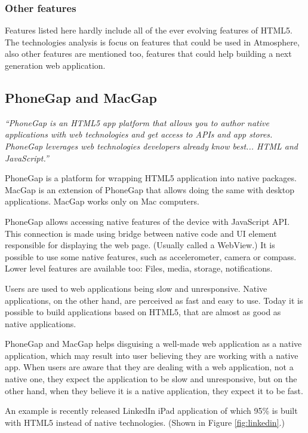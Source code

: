 \subsubsection{Other features}

Features listed here hardly include all of the ever evolving features of HTML5. The technologies analysis is focus on features that could be used in Atmosphere, also other features are mentioned too, features that could help building a next generation web application.

\subsection{PhoneGap and MacGap}

\emph{``PhoneGap is an HTML5 app platform that allows you to author native applications with web technologies and get access to APIs and app stores. PhoneGap leverages web technologies developers already know best... HTML and JavaScript.''} \citep{phonegap}

PhoneGap is a platform for wrapping HTML5 application into native packages. MacGap is an extension of PhoneGap that allows doing the same with desktop applications. MacGap works only on Mac computers.

PhoneGap allows accessing native features of the device with JavaScript API. This connection is made using bridge between native code and UI element responsible for displaying the web page. (Usually called a WebView.) It is possible to use some native features, such as accelerometer, camera or compass. Lower level features are available too: Files, media, storage, notifications. 

Users are used to web applications being slow and unresponsive. Native applications, on the other hand, are perceived as fast and easy to use. Today it is possible to build applications based on HTML5, that are almost as good as native applications.

PhoneGap and MacGap helps disguising a well-made web application as a native application, which may result into user believing they are working with a native app. When users are aware that they are dealing with a web application, not a native one, they expect the application to be slow and unresponsive, but on the other hand, when they believe it is a native application, they expect it to be fast.

An example is recently released LinkedIn iPad application of which 95\% is built with HTML5 instead of native technologies. (Shown in Figure \ref{fig:linkedin}.) \citep{linkedin_ipad}

